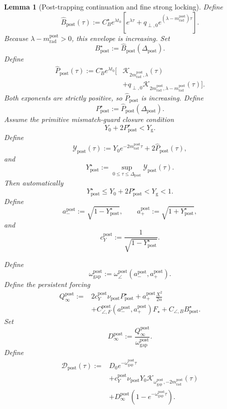 \documentclass{article} %
\theoremstyle{plain}
\newtheorem{lemma}[theorem]{Lemma}
\theoremstyle{definition}
\theoremstyle{remark}
\begin{document}
\begin{lemma}[Post-trapping continuation and fine strong locking]
Define
\[
\boxed{
\widehat B_{\mathrm{post}}(\tau)
:=
C_B^\star e^{\lambda t_0}
\left[
e^{\lambda\tau}
+
q_{\perp,0}e^{(\lambda-m_{\mathrm{rad}}^{\mathrm{post}})\tau}
\right].
}
\]
Because $\lambda-m_{\mathrm{rad}}^{\mathrm{post}}>0$, this envelope is
increasing.  Set
\[
\boxed{
B_{\mathrm{post}}^\star
:=
\widehat B_{\mathrm{post}}(\Delta_{\mathrm{post}}).
}
\]
Define
\[
\boxed{
\begin{aligned}
\widehat P_{\mathrm{post}}(\tau)
:=
C_B^\star e^{\lambda t_0}
\Big[&
\mathcal K_{2m_{\mathrm{rad}}^{\mathrm{post}},\lambda}(\tau)
\\
&+
q_{\perp,0}
\mathcal K_{2m_{\mathrm{rad}}^{\mathrm{post}},\lambda-m_{\mathrm{rad}}^{\mathrm{post}}}(\tau)
\Big].
\end{aligned}
}
\]
Both exponents are strictly positive, so
$\widehat P_{\mathrm{post}}$ is increasing.  Define
\[
\boxed{
P_{\mathrm{post}}^\star
:=
\widehat P_{\mathrm{post}}(\Delta_{\mathrm{post}}).
}
\]
Assume the primitive mismatch-guard closure condition
\[
\boxed{
Y_0+2P_{\mathrm{post}}^\star<Y_{\mathrm g}.
}
\]
Define
\[
\boxed{
\mathcal Y_{\mathrm{post}}(\tau)
:=
Y_0e^{-2m_{\mathrm{rad}}^{\mathrm{post}}\tau}
+
2\widehat P_{\mathrm{post}}(\tau),
}
\]
and
\[
\boxed{
Y_{\mathrm{post}}^\star
:=
\sup_{0\le\tau\le\Delta_{\mathrm{post}}}\mathcal Y_{\mathrm{post}}(\tau).
}
\]
Then automatically
\[
\boxed{
Y_{\mathrm{post}}^\star
\le
Y_0+2P_{\mathrm{post}}^\star
<Y_{\mathrm g}<1.
}
\]
Define
\[
\boxed{
a_-^{\mathrm{post}}:=\sqrt{1-Y_{\mathrm{post}}^\star},
\qquad
a_+^{\mathrm{post}}:=\sqrt{1+Y_{\mathrm{post}}^\star},
}
\]
and
\[
\boxed{
c_Y^{\mathrm{post}}
:=
\frac1{\sqrt{1-Y_{\mathrm{post}}^\star}}.
}
\]


Define
\[
\boxed{
\omega_{\mathrm{gap}}^{\mathrm{post}}
:=
\omega_\angle^{\mathrm{post}}(a_-^{\mathrm{post}},a_+^{\mathrm{post}}).
}
\]
Define the persistent forcing
\[
\boxed{
\begin{aligned}
Q_\infty^{\mathrm{post}}
:={}&
2c_Y^{\mathrm{post}}\nu_{\mathrm{post}}P_{\mathrm{post}}^\star
+
a_+^{\mathrm{post}}\frac{X^2}{2n}
\\
&+
C_{\angle,F}^{\mathrm{post}}(a_-^{\mathrm{post}},a_+^{\mathrm{post}})F_\star
+
C_{\angle,B}B_{\mathrm{post}}^\star.
\end{aligned}
}
\]
Set
\[
\boxed{
D_\infty^{\mathrm{post}}
:=
\frac{Q_\infty^{\mathrm{post}}}{\omega_{\mathrm{gap}}^{\mathrm{post}}}.
}
\]
Define
\[
\boxed{
\begin{aligned}
\mathcal D_{\mathrm{post}}(\tau)
:={}&
D_0e^{-\omega_{\mathrm{gap}}^{\mathrm{post}}\tau}
\\
&+
c_Y^{\mathrm{post}}\nu_{\mathrm{post}}Y_0
\mathcal K_{\omega_{\mathrm{gap}}^{\mathrm{post}},-2m_{\mathrm{rad}}^{\mathrm{post}}}(\tau)
\\
&+
D_\infty^{\mathrm{post}}
\left(1-e^{-\omega_{\mathrm{gap}}^{\mathrm{post}}\tau}\right).
\end{aligned}
}
\]


\end{lemma}
\end{document}
